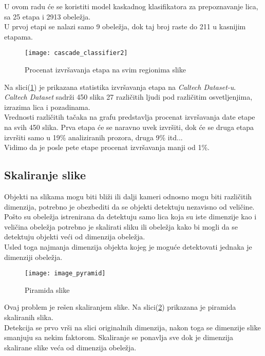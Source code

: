 U ovom radu će se koristiti model kaskadnog klasifikatora za
prepoznavanje lica, sa 25 etapa i 2913 obeležja. \\
U prvoj etapi se nalazi samo 9 obeležja, dok taj broj raste do 211 u kasnijim etapama.

\begin{figure}[H]
  \centering
  \texttt{[image: cascade\_classifier2]}
  \caption{Procenat izvršavanja etapa na svim regionima slike}
  \label{cascade_classifier_img2}
\end{figure}

Na slici(\ref{cascade_classifier_img2}) je prikazana statistika izvršavanja
etapa na \emph{Caltech Dataset-u}\cite{CALTECH_DATASET}.\\
\emph{Caltech Dataset} sadrži 450 slika 27 različitih
ljudi pod različitim osvetljenjima, izrazima lica i pozadinama. \\

Vrednosti različitih tačaka na grafu predstavlja procenat izvršavanja date etape
na svih 450 slika. Prva etapa će se naravno uvek izvršiti, dok će se druga etapa
izvršiti samo u 19\% analiziranih prozora, druga 9\% itd... \\
Vidimo da je posle pete etape procenat izvršavanja manji od 1\%. \\

\subsection{Skaliranje slike}\label{image_scaling}

Objekti na slikama mogu biti bliži ili dalji kameri odnosno mogu biti
različitih dimenzija, potrebno je obezbediti da se objekti detektuju nezavisno od
veličine. \\

Pošto su obeležja istrenirana da detektuju samo lica koja su iste dimenzije kao
i veličina obeležja potrebno je skalirati sliku ili obeležja kako bi
mogli da se detektuju objekti veći od dimenzija obeležja. \\
Usled toga najmanja dimenzija objekta kojeg je moguće detektovati jednaka je dimenziji obeležja.

\begin{figure}[H]
  \centering
  \texttt{[image: image\_pyramid]}
  \caption{Piramida slike\cite{ImagePyramid_web}}
  \label{image_pyramid}
\end{figure}

Ovaj problem je rešen skaliranjem slike.
Na slici(\ref{image_pyramid}) prikazana je piramida skaliranih slika. \\
Detekcija se prvo vrši na slici originalnih dimenzija, nakon toga se dimenzije
slike smanjuju sa nekim faktorom.
Skaliranje se ponavlja sve dok je dimenzija skalirane slike veća od dimenzija
obeležja. \\

